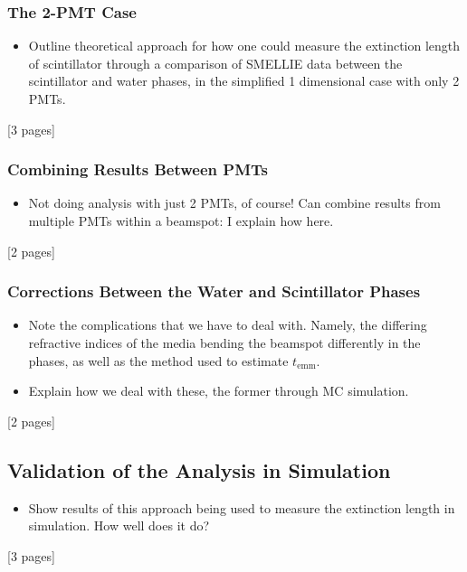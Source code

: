 {\subsubsection{The 2-PMT Case}
\begin{itemize}
    \item Outline theoretical approach for how one could measure the extinction length of scintillator through a comparison of SMELLIE data between the scintillator and water phases, in the simplified 1 dimensional case with only 2 PMTs.
\end{itemize}
[3 pages]

\subsubsection{Combining Results Between PMTs}
\begin{itemize}
    \item Not doing analysis with just 2 PMTs, of course! Can combine results from multiple PMTs within a beamspot: I explain how here.
\end{itemize}
[2 pages]

\subsubsection{Corrections Between the Water and Scintillator Phases}
\begin{itemize}
    \item Note the complications that we have to deal with. Namely, the differing refractive indices of the media bending the beamspot differently in the phases, as well as the method used to estimate $t_{\textrm{emm}}$.
    \item Explain how we deal with these, the former through MC simulation.
\end{itemize}
[2 pages]
\subsection{Validation of the Analysis in Simulation}
\begin{itemize}
    \item Show results of this approach being used to measure the extinction length in simulation. How well does it do?
\end{itemize}
[3 pages]
}
